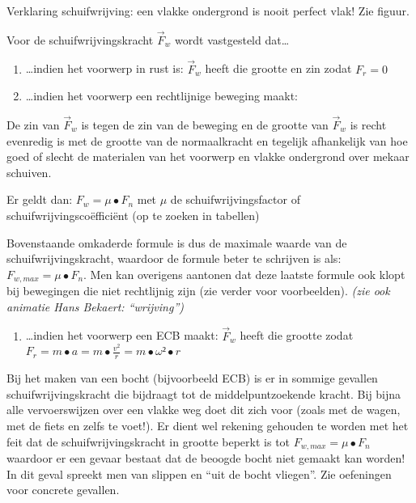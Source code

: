 \documentclass{ximera}
\newcommand{\ul}[1]{#1}
\begin{document}
Verklaring schuifwrijving: een vlakke ondergrond is nooit perfect vlak!
Zie figuur.

Voor de \ul{schuif}wrijvingskracht \({\overrightarrow{F}}_{w}\) wordt vastgesteld dat\ldots{}

\begin{enumerate}
\item\ldots indien het voorwerp in rust is: \({\overrightarrow{F}}_{w}\) heeft die grootte en zin zodat \(F_{r} = 0\)
\item\ldots indien het voorwerp een rechtlijnige beweging maakt:
\end{enumerate}

De zin van \({\overrightarrow{F}}_{w}\) is tegen de zin van de beweging en de grootte van \({\overrightarrow{F}}_{w}\) is recht evenredig is met de grootte van de normaalkracht en tegelijk afhankelijk van hoe goed of slecht de materialen van het voorwerp en vlakke ondergrond over mekaar schuiven.

Er geldt dan: \(F_{w} = \mu \bullet F_{n}\) met \(\mu\) de schuifwrijvingsfactor of schuifwrijvingscoëfficiënt (op te zoeken in tabellen)

Bovenstaande omkaderde formule is dus de maximale waarde van de schuifwrijvingskracht, waardoor de formule beter te schrijven is als: \(F_{w,max} = \mu \bullet F_{n}\). 
Men kan overigens aantonen dat deze laatste formule ook klopt bij bewegingen die niet rechtlijnig zijn (zie verder voor voorbeelden). 
\textit{(zie ook animatie Hans Bekaert: ``wrijving'')}

\begin{enumerate}
\def\labelenumi{\alph{enumi})}
\setcounter{enumi}{2}
\item
  \ldots indien het voorwerp een ECB maakt: \({\overrightarrow{F}}_{w}\)
  heeft die grootte zodat
  \(F_{r} = m \bullet a = m \bullet \frac{v^{2}}{r} = m \bullet \omega ² \bullet r\)
\end{enumerate}

Bij het maken van een bocht (bijvoorbeeld ECB) is er in sommige gevallen schuifwrijvingskracht die bijdraagt tot de middelpuntzoekende kracht. 
Bij bijna alle vervoerswijzen over een vlakke weg doet dit zich voor (zoals met de wagen, met de fiets en zelfs te voet!). 
Er dient wel rekening gehouden te worden met het feit dat de schuifwrijvingskracht in grootte beperkt is tot \(F_{w,max} = \mu \bullet F_{n}\) waardoor er een gevaar bestaat dat de beoogde bocht niet gemaakt kan worden! 
In dit geval spreekt men van slippen en ``uit de bocht vliegen''. 
Zie oefeningen voor concrete gevallen.
\end{document}
